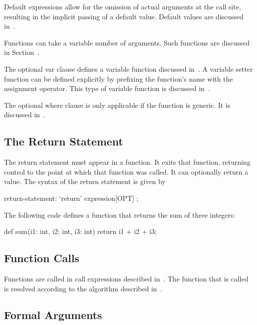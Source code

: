 Default expressions allow for the omission of actual arguments at the
call site, resulting in the implicit passing of a default value.
Default values are discussed in~.

Functions can take a variable number of arguments.  Such functions are
discussed in Section~.

The optional var clause defines a variable function discussed
in~.  A variable setter function can be
defined explicitly by prefixing the function's name with the
assignment operator.  This type of variable function is discussed
in~.

The optional where clause is only applicable if the function is
generic.  It is discussed in~.

\subsection{The Return Statement}
\label{The_Return_Statement}

The return statement must appear in a function.  It exits that
function, returning control to the point at which that function was
called.  It can optionally return a value.  The syntax of the return
statement is given by
\begin{syntax}
return-statement:
  `return' expression[OPT] ;
\end{syntax}

\begin{example}
The following code defines a function that returns the sum of three
integers:
\begin{chapel}
def sum(i1: int, i2: int, i3: int)
  return i1 + i2 + i3;
\end{chapel}
\end{example}

\subsection{Function Calls}
\label{Function_Calls}

Functions are called in call expressions described
in~.  The function that is called is resolved
according to the algorithm described in~.

\subsection{Formal Arguments}
\label{Formal_Arguments}

